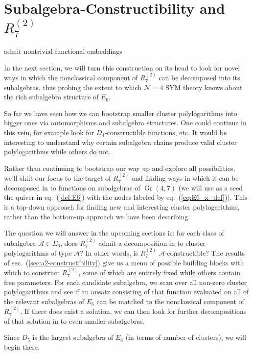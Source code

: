 \documentclass[11pt]{article}
\DeclareMathOperator{\Gr}{Gr}
\def\a{\mathcal{A}}
\def\pdfeq#1{\texorpdfstring{$#1$}{a}}
\begin{document}
\section{Subalgebra-Constructibility and \pdfeq{R^{(2)}_7}} \label{sec:r27-sub-constructibility}

 admit nontrivial functional embeddings

 In the next section, we will turn this construction on its head to look for novel ways in which the nonclassical component of $R^{(2)}_{7}$ can be decomposed into its subalgebras, thus probing the extent to which $\mathcal{N}=4$ SYM theory knows about the rich subalgebra structure of $E_6$.

So far we have seen how we can bootstrap smaller cluster polylogarithms into bigger ones via automorphisms and subalgebra structures. One could continue in this vein, for example look for $D_4$-constructible functions, etc. It would be interesting to understand why certain subalgebra chains produce valid cluster polylogarithms while others do not. 

Rather than continuing to bootstrap our way up and explore all possibilities, we'll shift our focus to the target of $R^{(2)}_7$ and finding ways in which it can be decomposed in to functions on subalgebras of $\Gr(4,7)$ (we will use as a seed the quiver in eq.~(\ref{def:E6}) with the nodes labeled by eq.~(\ref{eq:E6_x_def})). This is a top-down approach for finding new and interesting cluster polylogarithms, rather than the bottom-up approach we have been describing. 

The question we will answer in the upcoming sections is: for each class of subalgebra $\a \in E_6$, does $R^{(2)}_7$ admit a decomposition in to cluster polylogarithms of type $\a$? In other words, is $R^{(2)}_7$ $\a$-constructible? The results of sec.~(\ref{sec:a2-constructibility}) give us a menu of possible building blocks with which to construct $R^{(2)}_7$, some of which are entirely fixed while others contain free parameters. For each candidate subalgebra, we scan over all non-zero cluster polylogarithms and see if an ansatz consisting of that function evaluated on all of the relevant subalgebras of $E_6$ can be matched to the nonclassical component of $R^{(2)}_7$. If there does exist a solution, we can then look for further decompositions of that solution in to even smaller subalgebras. 

Since $D_5$ is the largest subalgebra of $E_6$ (in terms of number of clusters), we will begin there. 
\end{document}
